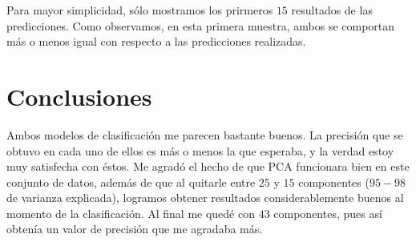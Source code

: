 \documentclass[letterpaper,11pt]{article}
\begin{document}
\begin{figure}[ht]
    \centering
    \qquad
\end{figure}

Para mayor simplicidad, sólo mostramos los prirmeros $15$ resultados de las 
predicciones. Como observamos, en esta primera muestra, ambos se comportan 
más o menos igual con respecto a las predicciones realizadas.

\section{Conclusiones}
Ambos modelos de clasificación me parecen bastante buenos. La precisión que se 
obtuvo en cada uno de ellos es más o menos la que esperaba, y la verdad estoy 
muy satisfecha con éstos. Me agradó el hecho de que PCA funcionara bien en 
este conjunto de datos, además de que al quitarle entre $25$ y $15$ componentes 
($95-98$ de varianza explicada), logramos obtener resultados considerablemente 
buenos al momento de la clasificación. Al final me quedé con $43$ componentes, 
pues así obtenía un valor de precisión que me agradaba más. 
\end{document}
